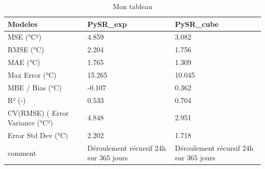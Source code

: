 \begin{table}
\caption{Mon tableau}
\label{tab:mon_tableau}
\begin{tabular}{lll}
\toprule
Modeles & PySR_exp & PySR_cube \\
\midrule
MSE (°C²) & 4.859 & 3.082 \\
RMSE (°C) & 2.204 & 1.756 \\
MAE (°C) & 1.765 & 1.309 \\
Max Error (°C) & 15.265 & 10.045 \\
MBE / Bias (°C) & -0.107 & 0.362 \\
R² (-) & 0.533 & 0.704 \\
CV(RMSE) (%
Error Variance (°C²) & 4.848 & 2.951 \\
Error Std Dev (°C) & 2.202 & 1.718 \\
comment & Déroulement récursif 24h sur 365 jours & Déroulement récursif 24h sur 365 jours \\
\bottomrule
\end{tabular}
\end{table}
